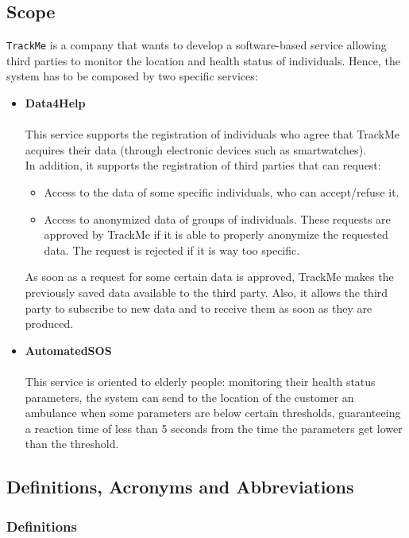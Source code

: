 \documentclass[12pt,a4paper]{article}
\begin{document}
		\subsection{Scope}
		\texttt{TrackMe} is a company that wants to develop a software-based service allowing third parties to monitor the location and health status of individuals.
		Hence, the system has to be composed by two specific services:
		\begin{itemize}
			\item \textbf{Data4Help}\\\\This service supports the registration of individuals who agree that TrackMe acquires their data (through electronic devices such as smartwatches). \\In addition, it supports the registration of third parties that can request:
				\begin{itemize}
					\item Access to the data of some specific individuals, who can accept/refuse it.
					\item Access to anonymized data of groups of individuals. These requests are approved by TrackMe if it is able to properly anonymize the requested data. The request is rejected if it is way too specific.
				\end{itemize}
		As soon as a request for some certain data is approved, TrackMe makes the previously saved data available to the third party. Also, it allows the third party to subscribe to new data and to receive them as soon as they are produced.
			\item \textbf{AutomatedSOS}\\\\This service is oriented to elderly people: monitoring their health status parameters, the system can send to the location of the customer an ambulance when some parameters are below certain thresholds, guaranteeing a reaction time of less than 5 seconds from the time the parameters get lower than the threshold.
		\end{itemize} 
	
	
		\subsection{Definitions, Acronyms and Abbreviations}
			\subsubsection{Definitions}
\end{document}
